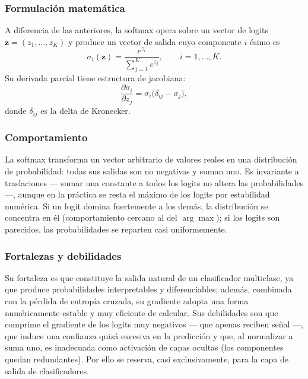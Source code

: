 \documentclass[12pt,a4paper]{article}
\begin{document}
\subsubsection{Formulación matemática}
A diferencia de las anteriores, la softmax opera sobre un vector de logits $\mathbf{z} = (z_1, \dotsc, z_K)$ y produce un vector de salida cuyo componente $i$-ésimo es
\begin{equation*}
\sigma_i(\mathbf{z}) = \frac{e^{z_i}}{\sum_{j=1}^{K} e^{z_j}}, \qquad i = 1, \dotsc, K.
\end{equation*}
Su derivada parcial tiene estructura de jacobiana:
\begin{equation*}
\frac{\partial \sigma_i}{\partial z_j} = \sigma_i\bigl(\delta_{ij} - \sigma_j\bigr),
\end{equation*}
donde $\delta_{ij}$ es la delta de Kronecker.

\subsubsection{Comportamiento}
La softmax transforma un vector arbitrario de valores reales en una distribución de probabilidad: todas sus salidas son no negativas y suman uno. Es invariante a traslaciones --- sumar una constante a todos los logits no altera las probabilidades ---, aunque en la práctica se resta el máximo de los logits por estabilidad numérica. Si un logit domina fuertemente a los demás, la distribución se concentra en él (comportamiento cercano al del $\arg\max$); si los logits son parecidos, las probabilidades se reparten casi uniformemente.

\subsubsection{Fortalezas y debilidades}
Su fortaleza es que constituye la salida natural de un clasificador multiclase, ya que produce probabilidades interpretables y diferenciables; además, combinada con la pérdida de entropía cruzada, su gradiente adopta una forma numéricamente estable y muy eficiente de calcular. Sus debilidades son que comprime el gradiente de los logits muy negativos --- que apenas reciben señal ---, que induce una confianza quizá excesiva en la predicción y que, al normalizar a suma uno, es inadecuada como activación de capas ocultas (los componentes quedan redundantes). Por ello se reserva, casi exclusivamente, para la capa de salida de clasificadores.
\end{document}
